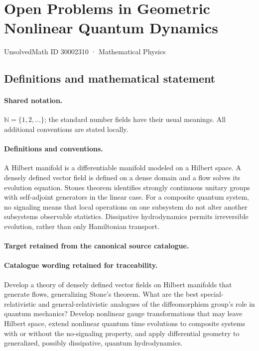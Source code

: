 \documentclass[11pt]{article}
\begin{document}
\setcounter{section}{30002309}
\section{Open Problems in Geometric Nonlinear Quantum Dynamics}\label{30002310}
{\small UnsolvedMath ID 30002310 · Mathematical Physics}
\subsection{Definitions and mathematical statement}

\paragraph{Shared notation.}$\mathbb N=\{1,2,\ldots\}$; the standard number fields have their usual meanings. All additional conventions are stated locally.


\paragraph{Definitions and conventions.}
A Hilbert manifold is a differentiable manifold modeled on a Hilbert space. A densely defined vector field is defined on a dense domain and a flow solves its evolution equation. Stone\textquotesingle s theorem identifies strongly continuous unitary groups with self-adjoint generators in the linear case. For a composite quantum system, no signaling means that local operations on one subsystem do not alter another subsystem\textquotesingle s observable statistics. Dissipative hydrodynamics permits irreversible evolution, rather than only Hamiltonian transport.

\paragraph{Target retained from the canonical source catalogue.}
\paragraph{Catalogue wording retained for traceability.}
Develop a theory of densely defined vector fields on Hilbert manifolds that generate flows, generalizing Stone’s theorem. What are the best special-relativistic and general-relativistic analogues of the diffeomorphism group’s role in quantum mechanics? Develop nonlinear gauge transformations that may leave Hilbert space, extend nonlinear quantum time evolutions to composite systems with or without the no-signaling property, and apply differential geometry to generalized, possibly dissipative, quantum hydrodynamics.
\end{document}
